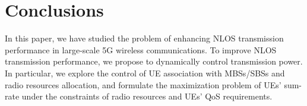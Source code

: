 \documentclass[10pt,journal,cspaper,compsoc]{IEEEtran}
\begin{document}
\section{Conclusions}
\label{sec:concl}

In this paper, we have studied the problem of enhancing NLOS transmission performance in large-scale 5G wireless communications. To improve NLOS transmission performance, we propose to dynamically control transmission power. In particular, we explore the control of UE association with MBSs/SBSs and radio resources allocation, and formulate the maximization problem of UEs' sum-rate under the constraints of radio resources and UEs' QoS requirements. 


%
%



%
%
\end{document}
